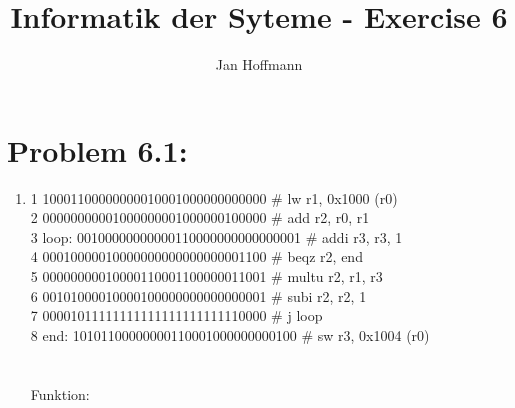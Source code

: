 \documentclass[10pt,a4paper]{article}
\title{Informatik der Syteme - Exercise 6}
\author{Jan Hoffmann}
\begin{document}
\section*{Problem 6.1:}
\begin{enumerate}
  \item 1       10001100000000010001000000000000 \# lw r1, 0x1000 (r0) \\
				2       00000000001000000001000000100000 \# add r2, r0, r1 \\
				3 loop: 00100000000000110000000000000001 \# addi r3, r3, 1 \\
				4       00010000010000000000000000001100 \# beqz r2, end \\
				5       00000000010000110001100000011001 \# multu r2, r1, r3 \\
				6       00101000010000100000000000000001 \# subi r2, r2, 1 \\
				7       00001011111111111111111111110000 \# j loop \\
				8	end:	10101100000000110001000000000100 \# sw r3, 0x1004 (r0) \\\\\\
	
	  Funktion: 
				
 		
\end{enumerate}
\end{document}
